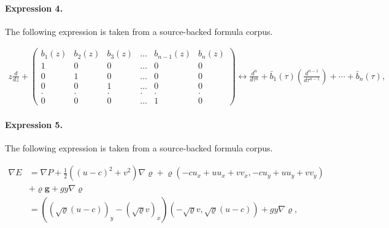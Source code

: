 \documentclass[11pt]{article}
\begin{document}
\paragraph{Expression 4.} The following expression is taken from a source-backed formula corpus.

\begin{align*}z\frac{d}{dz}+\left( \begin{array}{cccccc}b_{1}(z)&b_{2}(z)&b_{3}(z)&\ldots&b_{n-1}(z)&b_{n}(z)\\1&0&0&\ldots&0&0\\0&1&0&\ldots&0&0\\0&0&1&\ldots&0&0\\.&.&.&.&.&.\\0&0&0&\ldots&1&0 \end{array}\right)\leftrightarrow \frac{d^n}{d\tau^n}+\bar{b}_{1}(\tau)(\frac{d^{n-1}}{d\tau^{n-1}})+\cdots+\bar{b}_{n}(\tau),\end{align*}

\paragraph{Expression 5.} The following expression is taken from a source-backed formula corpus.

\begin{align*} \nabla E &= \nabla P + \frac{1}{2}((u-c)^2 + v^2) \nabla \varrho + \varrho ( -cu_x + uu_x + vv_x, -cu_y + uu_y + vv_y) \\ & + \varrho \mathbf{g} + gy \nabla \varrho \\ & = \left( (\sqrt{\varrho} (u-c))_y - (\sqrt{\varrho} v)_x\right) \left(-\sqrt{\varrho}v, \sqrt{\varrho}(u-c)\right) + gy \nabla \varrho, \end{align*}
\end{document}
